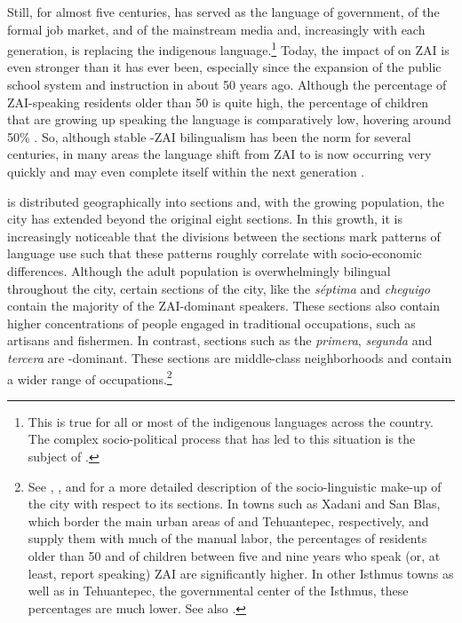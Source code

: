 \largerpage[-1]
Still, for almost five centuries,  has served as the language of government, of the formal job market, and of the mainstream media and, increasingly with each generation, is replacing the indigenous language.\footnote{This is true for all or most of the indigenous languages across the country. The complex socio-political process that has led to this situation is the subject of \citet{heath1972}.}  Today, the impact of  on ZAI is even stronger than it has ever been, especially since the expansion of the public school system and instruction in  about 50 years ago. Although the percentage of ZAI-speaking residents older than 50 is quite high, the percentage of children that are growing up speaking the language is comparatively low, hovering around 50\% \citep{augsburger2004}. So, although stable -ZAI bilingualism has been the norm for several centuries, in many areas the language shift from ZAI to  is now occurring very quickly and may even complete itself within the next generation \citep{augsburger2004}.

 is distributed geographically into sections and, with the growing population, the city has extended beyond the original eight sections. In this growth, it is increasingly noticeable that the divisions between the sections mark patterns of language use such that these patterns roughly correlate with socio-economic differences.  Although the adult population is overwhelmingly bilingual throughout the city, certain sections of the city, like the \textit{s\'{e}ptima} and \textit{cheguigo} contain the majority of the ZAI-dominant speakers. These sections also contain higher concentrations of people engaged in traditional occupations, such as artisans and fishermen. In contrast, sections such as the \textit{primera},  \textit{segunda} and  \textit{tercera} are -dominant. These sections are middle-class neighborhoods and contain a wider range of occupations.\footnote{See \citet{saynes2002}, \citet{augsburger2004}, and \citet[Chapter 1]{mccomsey2015} for a more detailed description of the socio-linguistic make-up of the city with respect to its sections. In towns such as Xadani and San Blas, which border the main urban areas of  and Tehuantepec, respectively, and supply them with much of the manual labor, the percentages of residents older than 50 and of children between five and nine years who speak (or, at least, report speaking) ZAI are significantly higher. In other Isthmus towns as well as in Tehuantepec, the governmental center of the Isthmus, these percentages are much lower. See also \citet{toledo2018}.} 

